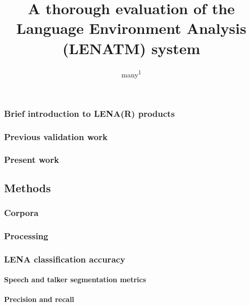 \documentclass[english,floatsintext,man]{apa6}
\title{A thorough evaluation of the Language Environment Analysis (LENATM)
system}
\author{many\textsuperscript{1}}
\affiliation{
    \vspace{0.5cm}
          \textsuperscript{1}   }
\begin{document}
\maketitle

\setcounter{secnumdepth}{0}



\subsubsection{Brief introduction to LENA(R)
products}\label{brief-introduction-to-lenar-products}

\subsubsection{Previous validation work}\label{previous-validation-work}

\subsubsection{Present work}\label{present-work}

\subsection{Methods}\label{methods}

\subsubsection{Corpora}\label{corpora}

\subsubsection{Processing}\label{processing}

\subsubsection{LENA classification
accuracy}\label{lena-classification-accuracy}

\paragraph{Speech and talker segmentation
metrics}\label{speech-and-talker-segmentation-metrics}

\paragraph{Precision and recall}\label{precision-and-recall}
\end{document}
